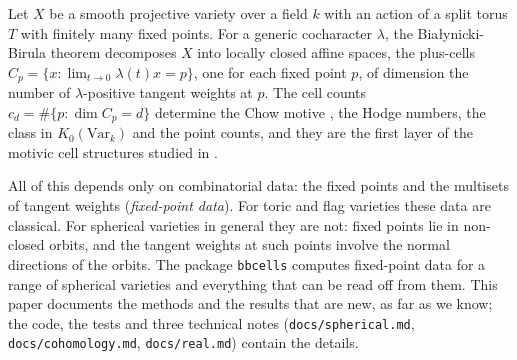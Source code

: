 \documentclass[11pt]{amsart}
\theoremstyle{definition}
\theoremstyle{remark}
\newcommand{\bbcells}{\texttt{bbcells}}
\newcommand{\code}[1]{\texttt{#1}}
\begin{document}
Let $X$ be a smooth projective variety over a field $k$ with an action of
a split torus $T$ with finitely many fixed points. For a generic
cocharacter $\lambda$, the Bia{\l}ynicki-Birula theorem \cite{BB73}
decomposes $X$ into locally closed affine spaces, the plus-cells
$C_p = \{x : \lim_{t\to 0}\lambda(t)x = p\}$, one for each fixed point $p$,
of dimension the number of $\lambda$-positive tangent weights at $p$. The
cell counts $c_d = \#\{p : \dim C_p = d\}$ determine the Chow motive
\cite{Brosnan}, the Hodge numbers, the class in $K_0(\mathrm{Var}_k)$ and
the point counts, and they are the first layer of the motivic cell
structures studied in \cite{DuggerIsaksen,Wendt,VoelkelQuadrics,VoelkelSpherical}.

All of this depends only on combinatorial data: the fixed points and the
multisets of tangent weights (\emph{fixed-point data}). For toric and flag
varieties these data are classical. For spherical varieties in general they
are not: fixed points lie in non-closed orbits, and the tangent weights at
such points involve the normal directions of the orbits. The package
\bbcells{} computes fixed-point data for a range of spherical varieties and
everything that can be read off from them. This paper documents the
methods and the results that are new, as far as we know; the code, the
tests and three technical notes (\code{docs/spherical.md},
\code{docs/cohomology.md}, \code{docs/real.md}) contain the details.
\end{document}
